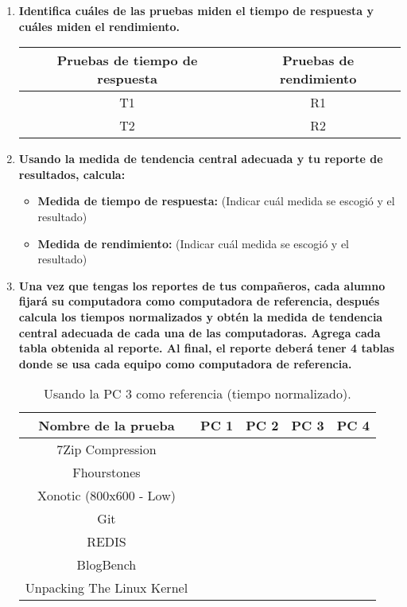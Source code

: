 \documentclass[12pt]{article}
\newcommand{\pl}[1]{\item \textbf{ #1 }}
\begin{document}
\begin{enumerate}[(3.3.1)]
    \pl{Identifica cuáles de las pruebas miden el tiempo de respuesta y cuáles miden el rendimiento.}
    \begin{table}[htb]
        \centering
        \begin{tabular}{|c|c|}
        \hline
        Pruebas de tiempo de respuesta & Pruebas de rendimiento \\
        \hline
        T1 & R1 \\
        \hline
        T2 & R2 \\
        \hline
        \end{tabular}
    \end{table}\par

    \pl{Usando la medida de tendencia central adecuada y tu reporte de resultados, calcula:}
    \begin{itemize}
        \pl{Medida de tiempo de respuesta:}(Indicar cuál medida se escogió y el resultado)\par
    
        \pl{Medida de rendimiento:} (Indicar cuál medida se escogió y el resultado)\par
    \end{itemize}

    \pl{Una vez que tengas los reportes de tus compañeros, cada alumno fijará su computadora como computadora de referencia, después calcula los tiempos normalizados y obtén la medida de tendencia central adecuada de cada una de las computadoras. Agrega cada tabla obtenida al reporte. Al final, el reporte deberá tener 4 tablas donde se usa cada equipo como computadora de referencia.}

    \begin{table}[htb]
        \centering
        \begin{tabular}{|c|c|c|c|c|}
        \hline
        \textbf{Nombre de la prueba} & \textbf{PC 1} & \textbf{PC 2} & \textbf{PC 3} & \textbf{PC 4}\\
        \hline
        7Zip Compression & & & & \\
        \hline
        Fhourstones & & & & \\
        \hline
        Xonotic (800x600 - Low) & & & &  \\
        \hline
        Git & & & &  \\
        \hline
        REDIS & & & &  \\
        \hline
        BlogBench & & & &  \\
        \hline
        Unpacking The Linux Kernel & & & & \\
        \hline
        \end{tabular}
        \caption{Usando la PC 3 como referencia (tiempo normalizado).}
    \end{table}


\end{enumerate}
\end{document}
